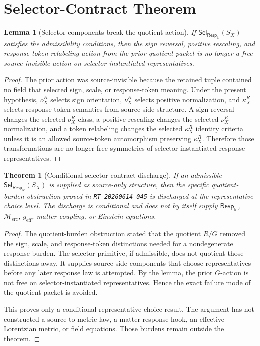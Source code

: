 \documentclass[11pt]{article}
\newcommand{\Msrc}{\mathcal{M}_{\mathrm{src}}}
\newcommand{\RespLC}{\mathsf{Resp}_{\mathrm{lc}}}
\newcommand{\SelResp}{\mathsf{Sel}_{\RespLC}}
\newcommand{\geff}{g_{\mathrm{eff}}}
\newtheorem{lemma}{Lemma}
\newtheorem{theorem}{Theorem}
\begin{document}
\section{Selector-Contract Theorem}

\begin{lemma}[Selector components break the quotient action]
If \(\SelResp(S_X)\) satisfies the admissibility conditions, then the
sign reversal, positive rescaling, and response-token relabeling action
from the prior quotient packet is no longer a free source-invisible
action on selector-instantiated representatives.
\end{lemma}

\begin{proof}
The prior action was source-invisible because the retained tuple
contained no field that selected sign, scale, or response-token
meaning. Under the present hypothesis, \(o^R_X\) selects sign
orientation, \(\nu^R_X\) selects positive normalization, and
\(\kappa^R_X\) selects response-token semantics from source-side
structure. A sign reversal changes the selected \(o^R_X\) class, a
positive rescaling changes the selected \(\nu^R_X\) normalization, and
a token relabeling changes the selected \(\kappa^R_X\) identity
criteria unless it is an allowed source-token automorphism preserving
\(\kappa^R_X\). Therefore those transformations are no longer free
symmetries of selector-instantiated response representatives.
\end{proof}

\begin{theorem}[Conditional selector-contract discharge]
If an admissible \(\SelResp(S_X)\) is supplied as source-only
structure, then the specific quotient-burden obstruction proved in
\texttt{RT-20260614-045} is discharged at the representative-choice
level. The discharge is conditional and does not by itself supply
\(\RespLC\), \(\Msrc\), \(\geff\), matter coupling, or Einstein
equations.
\end{theorem}

\begin{proof}
The quotient-burden obstruction stated that the quotient \(R/G\)
removed the sign, scale, and response-token distinctions needed for a
nondegenerate response burden. The selector primitive, if admissible,
does not quotient those distinctions away. It supplies source-side
components that choose representatives before any later response law is
attempted. By the lemma, the prior \(G\)-action is not free on
selector-instantiated representatives. Hence the exact failure mode of
the quotient packet is avoided.

This proves only a conditional representative-choice result. The
argument has not constructed a source-to-metric law, a matter-response
hook, an effective Lorentzian metric, or field equations. Those burdens
remain outside the theorem.
\end{proof}
\end{document}
